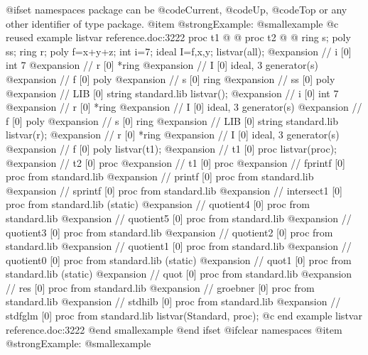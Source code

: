 {@ifset namespaces
package can be @code{Current}, @code{Up}, @code{Top} or any other
identifier of type package.
@item @strong{Example:}
@smallexample
@c reused example listvar reference.doc:3222 
  proc t1 @{ @}
  proc t2 @{ @}
  ring s;
  poly ss;
  ring r;
  poly f=x+y+z;
  int i=7;
  ideal I=f,x,y;
  listvar(all);
@expansion{} // i                    [0]  int 7
@expansion{} // r                    [0]  *ring
@expansion{} //      I                    [0]  ideal, 3 generator(s)
@expansion{} //      f                    [0]  poly
@expansion{} // s                    [0]  ring
@expansion{} //      ss                   [0]  poly
@expansion{} // LIB                  [0]  string standard.lib
  listvar();
@expansion{} // i                    [0]  int 7
@expansion{} // r                    [0]  *ring
@expansion{} //      I                    [0]  ideal, 3 generator(s)
@expansion{} //      f                    [0]  poly
@expansion{} // s                    [0]  ring
@expansion{} // LIB                  [0]  string standard.lib
  listvar(r);
@expansion{} // r                    [0]  *ring
@expansion{} // I                    [0]  ideal, 3 generator(s)
@expansion{} // f                    [0]  poly
  listvar(t1);
@expansion{} // t1                   [0]  proc
  listvar(proc);
@expansion{} // t2                   [0]  proc
@expansion{} // t1                   [0]  proc
@expansion{} // fprintf              [0]  proc from standard.lib
@expansion{} // printf               [0]  proc from standard.lib
@expansion{} // sprintf              [0]  proc from standard.lib
@expansion{} // intersect1           [0]  proc from standard.lib (static)
@expansion{} // quotient4            [0]  proc from standard.lib
@expansion{} // quotient5            [0]  proc from standard.lib
@expansion{} // quotient3            [0]  proc from standard.lib
@expansion{} // quotient2            [0]  proc from standard.lib
@expansion{} // quotient1            [0]  proc from standard.lib
@expansion{} // quotient0            [0]  proc from standard.lib (static)
@expansion{} // quot1                [0]  proc from standard.lib (static)
@expansion{} // quot                 [0]  proc from standard.lib
@expansion{} // res                  [0]  proc from standard.lib
@expansion{} // groebner             [0]  proc from standard.lib
@expansion{} // stdhilb              [0]  proc from standard.lib
@expansion{} // stdfglm              [0]  proc from standard.lib
  listvar(Standard, proc);
@c end example listvar reference.doc:3222
@end smallexample
@end ifset
@ifclear namespaces
@item @strong{Example:}
@smallexample
}
